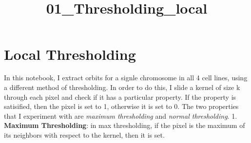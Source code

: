 \documentclass[11pt]{article}
\title{01\_Thresholding\_local}
\begin{document}
    
    
    \maketitle
    
    

    
    \section{Local Thresholding}\label{local-thresholding}

In this notebook, I extract orbits for a signle chromosome in all 4 cell
lines, using a different method of thresholding. In order to do this, I
slide a kernel of size k through each pixel and check if it has a
particular property. If the property is satisified, then the pixel is
set to 1, otherwise it is set to 0. The two properties that I experiment
with are \emph{maximum thresholding} and \emph{normal thresholding}. 1.
\textbf{Maximum Thresholding}: in max thresholding, if the pixel is the
maximum of its neighbors with respect to the kernel, then it is set.
\end{document}
